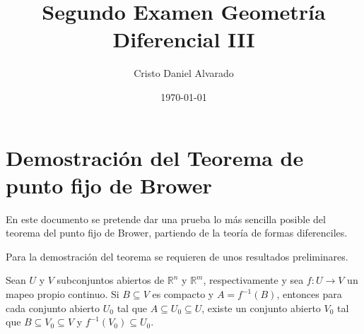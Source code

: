 \documentclass[12pt]{report}
\theoremstyle{largebreak}
\newcommand\cf[3]{\ensuremath{#1:#2\rightarrow#3}}
\begin{document}
    \title{Segundo Examen Geometría Diferencial III}
    \author{Cristo Daniel Alvarado}
    \date{\today}
    \maketitle

    \setcounter{chapter}{3} %
    \setcounter{section}{5}
    \section{Demostración del Teorema de punto fijo de Brower}
    
En este documento se pretende dar una prueba lo más sencilla posible del teorema del punto fijo de Brower, partiendo de la teoría de formas diferenciles. 

Para la demostración del teorema se requieren de unos resultados preliminares.

\setcounter{section}{4}
\setcounter{theor}{6}

\begin{theor}
    Sean $U$ y $V$ subconjuntos abiertos de $\mathbb{R}^n$ y $\mathbb{R}^m$, respectivamente y sea $\cf{f}{U}{V}$ un mapeo propio continuo. Si $B\subseteq V$ es compacto y $A=f^{-1}(B)$, entonces para cada conjunto abierto $U_0$ tal que $A\subseteq U_0\subseteq U$, existe un conjunto abierto $V_0$ tal que $B\subseteq V_0\subseteq V$ y $f^{-1}(V_0)\subseteq U_0$.
\end{theor}
\end{document}
